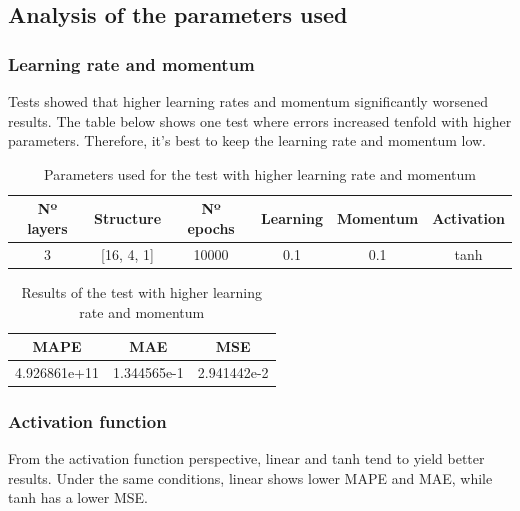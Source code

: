 \documentclass[11pt, a4paper]{article}
\begin{document}
\subsection{Analysis of the parameters used}

\subsubsection{Learning rate and momentum}

Tests showed that higher learning rates and momentum significantly worsened results. The table below shows one test where errors increased tenfold 
with higher parameters. Therefore, it's best to keep the learning rate and momentum low.

\begin{table}[H]
    \centering
    \begin{tabular}{|c|c|c|c|c|c|}
        \hline
        \textbf{Nº layers} & \textbf{Structure}  & \textbf{Nº epochs} & \textbf{Learning} & \textbf{Momentum} & \textbf{Activation} \\ \hline
        3         & [16, 4, 1] & 10000     & 0.1     & 0.1     & tanh       \\ \hline

    \end{tabular}
    \caption{Parameters used for the test with higher learning rate and momentum}
    \label{tab:table_bp_parameters_higher}
\end{table}

\begin{table}[H]
    \centering
    \begin{tabular}{|c|c|c|}
        \hline
        \textbf{MAPE}         & \textbf{MAE}         & \textbf{MSE}         \\ \hline
        4.926861e+11 & 1.344565e-1 & 2.941442e-2 \\ \hline
    \end{tabular}
    \caption{Results of the test with higher learning rate and momentum}
    \label{tab:table_bp_results_higher}
\end{table}

\subsubsection{Activation function}

From the activation function perspective, linear and tanh tend to yield better results. Under the same conditions, linear shows lower 
MAPE and MAE, while tanh has a lower MSE.
\end{document}
